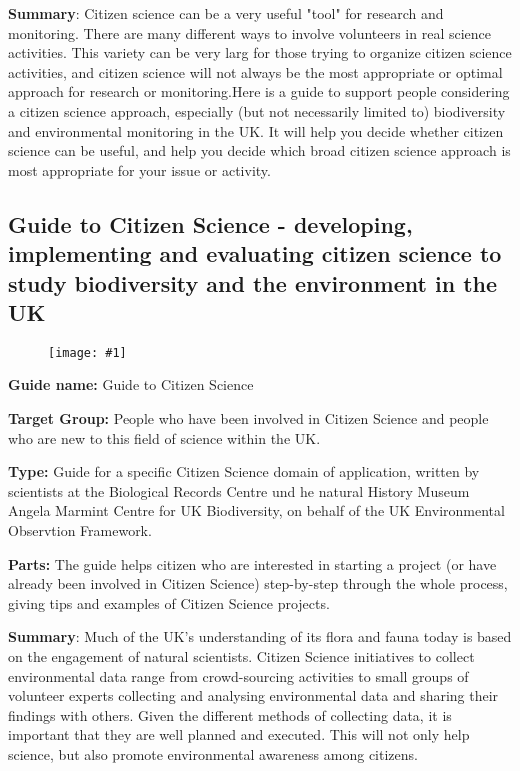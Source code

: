 \documentclass{article}
\newlength{\imgwidth}
\newcommand\scaledgraphics[2]{%
                
\settowidth{\imgwidth}{\texttt{[image: \#1]}}%
                
\setlength{\imgwidth}{\minof{\imgwidth}{#2\textwidth}}%
                
\texttt{[image: \#1]}%
                
}
\begin{document}
\textbf{Summary}: Citizen science can be a very useful "tool" for research and monitoring. There are many different ways to involve volunteers in real science activities. This variety can be very larg for those trying to organize citizen science activities, and citizen science will not always be the most appropriate or optimal approach for research or monitoring.Here is a guide to support people considering a citizen science approach, especially (but not necessarily limited to) biodiversity and environmental monitoring in the UK. It will help you decide whether citizen science can be useful, and help you decide which broad citizen science approach is most appropriate for your issue or activity. 


\subsection{Guide to Citizen Science - developing, implementing and evaluating citizen science to study biodiversity and the environment in the UK}\label{H3514415}


\begin{figure}
\scaledgraphics{bfcdb806-4a62-40b9-92f8-a4b78de8ea77.png}{0.5}
\label{F60825051}
\end{figure}


\textbf{Guide name: }Guide to Citizen Science\textbf{ } \autocite{tweddle_guide_2012}


\textbf{Target Group: }People who have been involved in Citizen Science and people who are new to this field of science within the UK.


\textbf{Type: }Guide for a specific Citizen Science domain of application, written by scientists at the Biological Records Centre und he natural History Museum Angela Marmint Centre for UK Biodiversity, on behalf of the UK Environmental Observtion Framework.


\textbf{Parts: }The guide helps citizen who are interested in starting a project (or have already been involved in Citizen Science) step-by-step through the whole process, giving tips and examples of Citizen Science projects.


\textbf{Summary}: Much of the UK's understanding of its flora and fauna today is based on the engagement of natural scientists. Citizen Science initiatives to collect environmental data range from crowd-sourcing activities to small groups of volunteer experts collecting and analysing environmental data and sharing their findings with others. Given the different methods of collecting data, it is important that they are well planned and executed. This will not only help science, but also promote environmental awareness among citizens.
\end{document}
